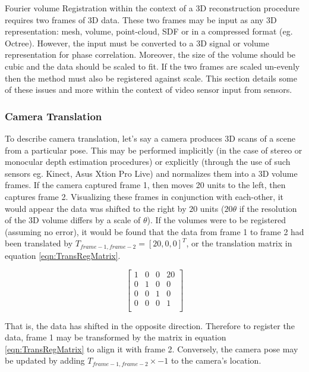 Fourier volume Registration within the context of a 3D reconstruction procedure requires two frames of 3D data. These two frames may be input as any 3D representation: mesh, volume, point-cloud, SDF or in a compressed format (eg. Octree). However, the input must be converted to a 3D signal or volume representation for phase correlation. Moreover, the size of the volume should be cubic and the data should be scaled to fit. If the two frames are scaled un-evenly then the method must also be registered against scale. This section details some of these issues and more within the context of video sensor input from sensors.  \\
 

\subsubsection{Camera Translation}
\label{sec:PCForSLAM}
To describe camera translation, let's say a camera produces 3D scans of a scene from a particular pose. This may be performed implicitly (in the case of stereo or monocular depth estimation procedures) or explicitly (through the use of such sensors eg. Kinect, Asus Xtion Pro Live) and normalizes them into a 3D volume frames. If the camera captured frame 1, then moves 20 units to the left, then captures frame 2. Visualizing these frames in conjunction with each-other, it would appear the data was shifted to the right by $20$ units ($20\theta$ if the resolution of the 3D volume differs by a scale of $\theta$). If the volumes were to be registered (assuming no error), it would be found that the data from frame 1 to frame 2 had been translated by $T_{frame-1,frame-2} = [20,0,0]^T$, or the translation matrix in equation \ref{eqn:TransRegMatrix}.

\begin{equation} \label{eqn:TransRegMatrix}
\left[
\begin{array}{cccc}
1 & 0 & 0 & 20 \\
0 & 1 & 0 & 0 \\
0 & 0 & 1 & 0 \\
0 & 0 & 0 & 1 \\
\end{array}
\right]
\end{equation}

That is, the data has shifted in the opposite direction. Therefore to register the data, frame 1 may be transformed by the matrix in equation \ref{eqn:TransRegMatrix} to align it with frame 2. Conversely, the camera pose may be updated by adding $T_{frame-1,frame-2} \times -1$ to the camera's location.  \\

